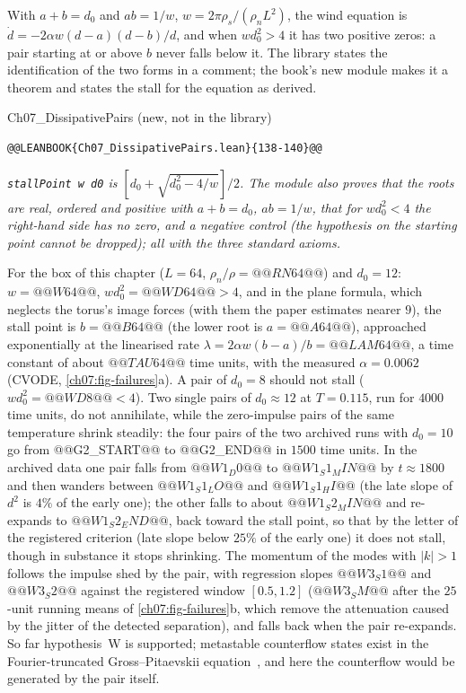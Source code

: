 With $a+b=d_0$ and $ab=1/w$, $w=2\pi\rho_s/(\rho_nL^2)$, the wind equation is $\dot d=-2\alpha w(d-a)(d-b)/d$, and when $wd_0^2>4$ it has two positive zeros: a pair starting at or above $b$ never falls below it. The library states the identification of the two forms in a comment; the book's new module makes it a theorem and states the stall for the equation as derived.

\begin{leanbox}[unbreakable]{Ch07\_DissipativePairs (new, not in the library)}
\begin{lstlisting}[style=lean,basicstyle=\ttfamily\footnotesize]
@@LEANBOOK{Ch07_DissipativePairs.lean}{138-140}@@
\end{lstlisting}
\nopagebreak[4]\smallskip\noindent\textit{\texttt{stallPoint w d0} is $[d_0+\sqrt{d_0^2-4/w}]/2$. The module also proves that the roots are real, ordered and positive with $a+b=d_0$, $ab=1/w$, that for $wd_0^2<4$ the right-hand side has no zero, and a negative control (the hypothesis on the starting point cannot be dropped); all with the three standard axioms.}
\end{leanbox}

For the box of this chapter ($L=64$, $\rho_n/\rho=@@RN64@@$) and $d_0=12$: $w=@@W64@@$, $wd_0^2=@@WD64@@>4$, and in the plane formula, which neglects the torus's image forces (with them the paper estimates nearer $9$), the stall point is $b=@@B64@@$ (the lower root is $a=@@A64@@$), approached exponentially at the linearised rate $\lambda=2\alpha w(b-a)/b=@@LAM64@@$, a time constant of about
$@@TAU64@@$ time units, with the measured $\alpha=0.0062$ (CVODE, \cref{ch07:fig-failures}a). A pair of $d_0=8$ should not stall ($wd_0^2=@@WD8@@<4$). Two single pairs of $d_0\approx12$ at $T=0.115$, run for $4000$ time units, do not annihilate, while the zero-impulse pairs of the same temperature shrink steadily: the four pairs of the two archived runs with $d_0=10$ go from @@G2_START@@ to @@G2_END@@ in $1500$ time units. In the archived data one
pair falls from $@@W1_D0@@$ to $@@W1_S1_MIN@@$ by $t\approx1800$ and then wanders between $@@W1_S1_LO@@$ and $@@W1_S1_HI@@$ (the late slope of $d^2$ is $4\%$ of the early one); the other falls to about $@@W1_S2_MIN@@$ and re-expands to $@@W1_S2_END@@$, back toward the stall point, so that by the letter of the registered criterion (late slope below $25\%$ of the early one) it does not stall, though in
substance it stops shrinking. The momentum of the modes with $|k|>1$ follows the impulse shed by the pair, with regression slopes $@@W3_S1@@$ and $@@W3_S2@@$ against the registered window $[0.5,1.2]$ ($@@W3_SM@@$ after the $25$-unit running means of \cref{ch07:fig-failures}b, which remove the attenuation caused by the jitter of the detected separation), and falls back when the pair re-expands. So far hypothesis~W is
supported; metastable counterflow states exist in the Fourier-truncated Gross--Pitaevskii equation~\cite{KrstulovicBrachet2011}, and here the counterflow would be generated by the pair itself.

